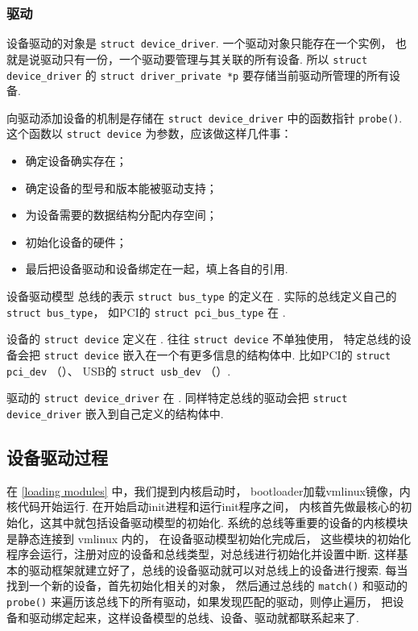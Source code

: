 \subsubsection{驱动}
设备驱动的对象是 \lstinline{struct device_driver}.
一个驱动对象只能存在一个实例，
也就是说驱动只有一份，一个驱动要管理与其关联的所有设备.
所以 \lstinline{struct device_driver} 的 \lstinline{struct driver_private *p}
要存储当前驱动所管理的所有设备.

向驱动添加设备的机制是存储在 \lstinline{struct device_driver} 中的函数指针
\lstinline{probe()}.
这个函数以 \lstinline{struct device} 为参数，应该做这样几件事\cite{devicedriver}：
\begin{itemize}
	\item 确定设备确实存在；
	\item 确定设备的型号和版本能被驱动支持；
	\item 为设备需要的数据结构分配内存空间；
	\item 初始化设备的硬件；
	\item 最后把设备驱动和设备绑定在一起，填上各自的引用.
\end{itemize}
\begin{readsrcbox}{设备驱动模型}
	总线的表示 \lstinline{struct bus_type}
	的定义在 .
	实际的总线定义自己的 \lstinline{struct bus_type}，
	如PCI的 \lstinline{struct pci_bus_type} 在 .

	设备的 \lstinline{struct device}
	定义在 .
	往往 \lstinline{struct device} 不单独使用，
	特定总线的设备会把 \lstinline{struct device} 嵌入在一个有更多信息的结构体中.
	比如PCI的 \lstinline{struct pci_dev} （）、
	USB的 \lstinline{struct usb_dev} （）.

	驱动的 \lstinline{struct device_driver} 
	在 .
	同样特定总线的驱动会把 \lstinline{struct device_driver} 嵌入到自己定义的结构体中.
\end{readsrcbox}

\subsection{设备驱动过程}
在 \ref{loading modules} 中，我们提到内核启动时，
bootloader加载vmlinux镜像，内核代码开始运行.
在开始启动init进程和运行init程序之间，
内核首先做最核心的初始化，这其中就包括设备驱动模型的初始化.
系统的总线等重要的设备的内核模块是静态连接到 vmlinux 内的，
在设备驱动模型初始化完成后，
这些模块的初始化程序会运行，注册对应的设备和总线类型，对总线进行初始化并设置中断.
这样基本的驱动框架就建立好了，总线的设备驱动就可以对总线上的设备进行搜索.
每当找到一个新的设备，首先初始化相关的对象，
然后通过总线的 \lstinline{match()} 和驱动的 \lstinline{probe()}
来遍历该总线下的所有驱动，如果发现匹配的驱动，则停止遍历，
把设备和驱动绑定起来，这样设备模型的总线、设备、驱动就都联系起来了.

